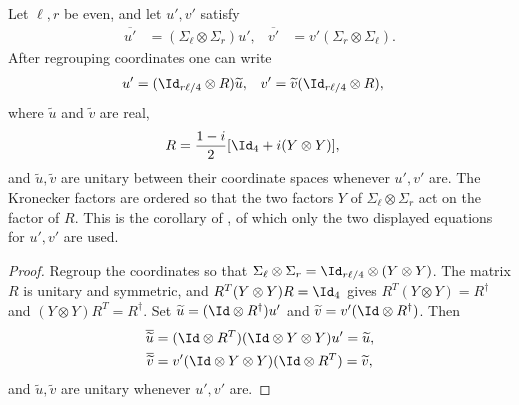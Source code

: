 \begin{lemma}
    \label{cor:sympl-to-orthogonal}
    \leanok
    Let $\ell,r$ be even, and let $u',v'$ satisfy
    \begin{align}
        \overline{u'} & =(\Sigma_\ell\otimes\Sigma_r)u', &
        \overline{v'} & =v'(\Sigma_r\otimes\Sigma_\ell).
    \end{align}
    After regrouping coordinates one can write
    \begin{align}
        u' & =(\Id_{r\ell/4}\otimes R)\widetilde u, &
        v' & =\widetilde v(\Id_{r\ell/4}\otimes R),
    \end{align}
    where $\widetilde u$ and $\widetilde v$ are real,
    \begin{align}
        R & =\frac{1-i}{2}[\Id_4+i(Y\otimes Y)],
    \end{align}
    and $\widetilde u,\widetilde v$ are unitary between their coordinate
    spaces whenever $u',v'$ are. The Kronecker factors are ordered so that
    the two factors $Y$ of $\Sigma_\ell\otimes\Sigma_r$ act on the factor of
    $R$. This is the corollary of \cite[lines~1165--1191]{Cirac2017MPU},
    of which only the two displayed equations for $u',v'$ are used.
\end{lemma}

\begin{proof}
    \leanok
    Regroup the coordinates so that
    $\Sigma_\ell\otimes\Sigma_r=\Id_{r\ell/4}\otimes(Y\otimes Y)$. The matrix
    $R$ is unitary and symmetric, and $R^T(Y\otimes Y)R=\Id_4$ gives
    $R^T(Y\otimes Y)=R^\dagger$ and $(Y\otimes Y)R^T=R^\dagger$. Set
    $\widetilde u=(\Id\otimes R^\dagger)u'$ and
    $\widetilde v=v'(\Id\otimes R^\dagger)$. Then
    \begin{align}
        \overline{\widetilde u} & =(\Id\otimes R^T)(\Id\otimes Y\otimes Y)u'=\widetilde u, \\
        \overline{\widetilde v} & =v'(\Id\otimes Y\otimes Y)(\Id\otimes R^T)=\widetilde v,
    \end{align}
    and $\widetilde u,\widetilde v$ are unitary whenever $u',v'$ are.
\end{proof}

